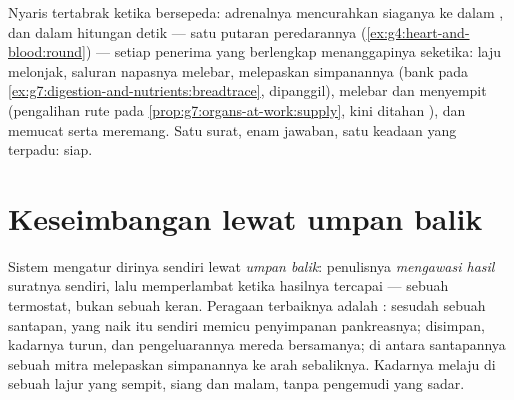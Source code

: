 \begin{example}\label{ex:g8:hormonal-communication:alarm}
Nyaris tertabrak ketika bersepeda:  adrenalnya
mencurahkan  siaganya ke dalam , dan dalam
hitungan detik --- satu putaran peredarannya
(\cref{ex:g4:heart-and-blood:round}) --- setiap penerima
yang berlengkap menanggapinya seketika: laju 
melonjak, saluran napasnya melebar,  melepaskan
 simpanannya (bank pada
\cref{ex:g7:digestion-and-nutrients:breadtrace}, dipanggil),
  melebar dan  
menyempit (pengalihan rute pada
\cref{prop:g7:organs-at-work:supply}, kini ditahan ),
dan  memucat serta meremang. Satu surat, enam
jawaban, satu keadaan yang terpadu: siap.
\end{example}

\section{Keseimbangan lewat umpan balik}

\begin{proposition}\label{prop:g8:hormonal-communication:feedback}
Sistem  mengatur dirinya sendiri lewat \emph{umpan
balik}:  penulisnya
\emph{mengawasi hasil} suratnya sendiri, lalu memperlambat
ketika hasilnya tercapai --- sebuah termostat, bukan sebuah
keran. Peragaan terbaiknya adalah  : sesudah
sebuah santapan,  yang naik itu sendiri memicu 
penyimpanan pankreasnya;  disimpan, kadarnya
turun, dan pengeluarannya mereda bersamanya; di antara
santapannya sebuah  mitra melepaskan simpanannya ke
arah sebaliknya. Kadarnya melaju di sebuah lajur yang
sempit, siang dan malam, tanpa pengemudi yang sadar.
\end{proposition}
\admitted

